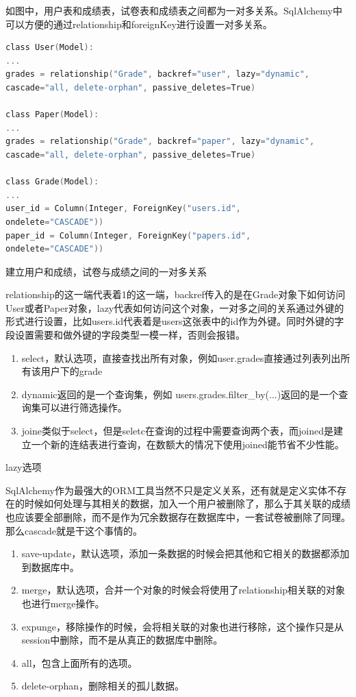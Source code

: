 如图中，用户表和成绩表，试卷表和成绩表之间都为一对多关系。SqlAlchemy中可以方便的通过relationship和foreignKey进行设置一对多关系。

\begin{lstlisting}[language=C]
class User(Model):
...
grades = relationship("Grade", backref="user", lazy="dynamic",
cascade="all, delete-orphan", passive_deletes=True)

class Paper(Model):
...
grades = relationship("Grade", backref="paper", lazy="dynamic",
cascade="all, delete-orphan", passive_deletes=True)

class Grade(Model):
...
user_id = Column(Integer, ForeignKey("users.id",
ondelete="CASCADE"))
paper_id = Column(Integer, ForeignKey("papers.id",
ondelete="CASCADE"))
\end{lstlisting}

\begin{center}
	{\small 建立用户和成绩，试卷与成绩之间的一对多关系}
\end{center}

relationship的这一端代表着1的这一端，backref传入的是在Grade对象下如何访问User或者Paper对象，lazy代表如何访问这个对象，一对多之间的关系通过外键的形式进行设置，比如users.id代表着是users这张表中的id作为外键。同时外键的字段设置需要和做外键的字段类型一模一样，否则会报错。

\begin{enumerate}
	\item select，默认选项，直接查找出所有对象，例如user.grades直接通过列表列出所有该用户下的grade
	\item dynamic返回的是一个查询集，例如 users.grades.filter\_by(...)返回的是一个查询集可以进行筛选操作。
	\item joine类似于select，但是seletc在查询的过程中需要查询两个表，而joined是建立一个新的连结表进行查询，在数额大的情况下使用joined能节省不少性能。
\end{enumerate}

\begin{center}
	{\small lazy选项}
\end{center}

SqlAlchemy作为最强大的ORM工具当然不只是定义关系，还有就是定义实体不存在的时候如何处理与其相关的数据，加入一个用户被删除了，那么于其关联的成绩也应该要全部删除，而不是作为冗余数据存在数据库中，一套试卷被删除了同理。那么cascade就是干这个事情的。

\begin{enumerate}
	\item save-update，默认选项，添加一条数据的时候会把其他和它相关的数据都添加到数据库中。
	\item merge，默认选项，合并一个对象的时候会将使用了relationship相关联的对象也进行merge操作。
	\item expunge，移除操作的时候，会将相关联的对象也进行移除，这个操作只是从session中删除，而不是从真正的数据库中删除。
	\item all，包含上面所有的选项。
	\item delete-orphan，删除相关的孤儿数据。
	\label{cascade选项}
\end{enumerate}

